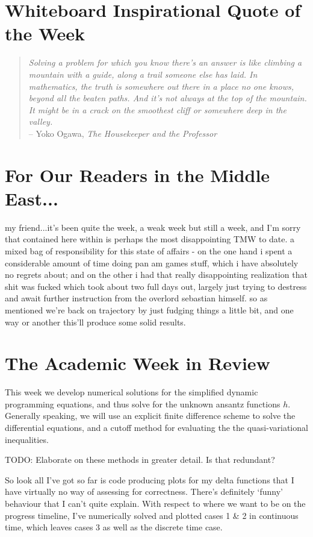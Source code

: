 \documentclass[12pt]{article}
\begin{document}
\newpage
\section*{Whiteboard Inspirational Quote of the Week}
\begin{quote}
\textit{Solving a problem for which you know there's an answer is like climbing a mountain with a guide, along a trail someone else has laid. In mathematics, the truth is somewhere out there in a place no one knows, beyond all the beaten paths. And it's not always at the top of the mountain. It might be in a crack on the smoothest cliff or somewhere deep in the valley.} \\-- Yoko Ogawa, \textit{The Housekeeper and the Professor}
\end{quote} 

\section*{For Our Readers in the Middle East...}
my friend...it's been quite the week, a weak week but still a week, and I'm sorry that contained here within is perhaps the most disappointing TMW to date. a mixed bag of responsibility for this state of affairs - on the one hand i spent a considerable amount of time doing pan am games stuff, which i have absolutely no regrets about; and on the other i had that really disappointing realization that shit was fucked which took about two full days out, largely just trying to destress and await further instruction from the overlord sebastian himself. so as mentioned we're back on trajectory by just fudging things a little bit, and one way or another this'll produce some solid results.

\section*{The Academic Week in Review}
This week we develop numerical solutions for the simplified dynamic programming equations, and thus solve for the unknown ansantz functions $h$. Generally speaking, we will use an explicit finite difference scheme to solve the differential equations, and a cutoff method for evaluating the the quasi-variational inequalities. 

TODO: Elaborate on these methods in greater detail. Is that redundant? 

So look all I've got so far is code producing plots for my delta functions that I have virtually no way of assessing for correctness. There's definitely `funny' behaviour that I can't quite explain. With respect to where we want to be on the progress timeline, I've numerically solved and plotted cases 1 \& 2 in continuous time, which leaves cases 3 as well as the discrete time case. 
\end{document}
